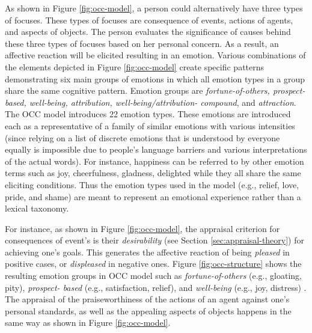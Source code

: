 \documentclass[11pt]{article}
\begin{document}
As shown in Figure \ref{fig:occ-model}, a person could alternatively have three
types of focuses. These types of focuses are consequence of events, actions of
agents, and aspects of objects. The person evaluates the significance of causes
behind these three types of focuses based on her personal concern. As a
result, an affective reaction will be elicited resulting in an emotion. Various
combinations of the elements depicted in Figure \ref{fig:occ-model} create
specific patterns demonstrating six main groups of emotions in which all emotion
types in a group share the same cognitive pattern. Emotion groups are
\textit{fortune-of-others, prospect-based, well-being, attribution,
well-being/attribution- compound}, and \textit{attraction}. The OCC model
introduces 22 emotion types. These emotions are introduced each as a
representative of a family of similar emotions with various intensities
(since relying on a list of discrete emotions that is understood by everyone
equally is impossible due to people's language barriers and various
interpretations of the actual words). For instance, happiness can be referred
to by other emotion terms such as joy, cheerfulness, gladness, delighted while
they all share the same eliciting conditions. Thus the emotion types used in the
model (e.g., relief, love, pride, and shame) are meant to represent an emotional
experience rather than a lexical taxonomy.

For instance, as shown in Figure \ref{fig:occ-model}, the appraisal criterion
for consequences of event’s is their \textit{desirability} (see Section
\ref{sec:appraisal-theory}) for achieving one's goals. This generates the
affective reaction of being \textit{pleased} in positive cases, or
\textit{displeased} in negative ones. Figure \ref{fig:occ-structure} shows the
resulting emotion groups in OCC model such as \textit{fortune-of-others} (e.g.,
gloating, pity), \textit{prospect- based} (e.g., satisfaction, relief), and
\textit{well-being} (e.g., joy, distress) \cite{occ:structure}. The appraisal of
the praiseworthiness of the actions of an agent against one's personal
standards, as well as the appealing aspects of objects happens in the same way
as shown in Figure \ref{fig:occ-model}.
\end{document}
